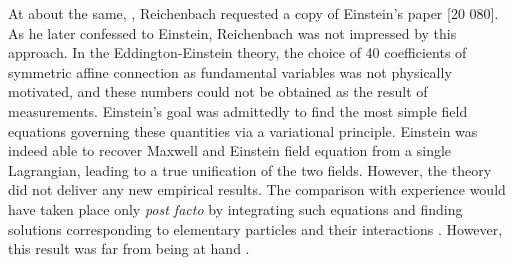 \documentclass[draft]{article}
\begin{document}
At about the same, , Reichenbach requested a copy of Einstein's paper  \citep{Einstein1923c} [20 080]. As he later confessed to Einstein, Reichenbach was not impressed by this approach. In the Eddington-Einstein theory, the choice of 40 coefficients of symmetric affine connection \Gtmn as fundamental variables was not physically motivated, and these numbers could not be obtained as the result of measurements. Einstein's goal was admittedly to find the most simple field equations  governing these quantities via a variational principle. Einstein was indeed able to recover Maxwell and Einstein field equation from a single Lagrangian, leading to a true unification of the two fields. However, the theory did not deliver any new empirical results. The comparison with experience would have taken place only \emph{post facto} by integrating such equations and finding solutions corresponding to elementary particles and their interactions . However, this result was far from being at hand \citep[140]{Einstein1923e}. 
\end{document}
